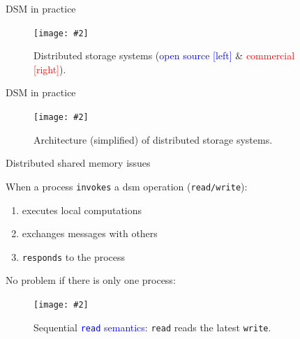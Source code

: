 \documentclass{beamer}
\newcommand{\fig}[3]
{
  \begin{figure}[htp]
    \centering
      \texttt{[image: \#2]}
      \caption[labelInTOC]{#3}
  \end{figure}
}
\newcommand{\blue}[1]{\textcolor{blue}{#1}}
\begin{document}
\begin{frame}{DSM in practice}
  \fig{width = 0.80\textwidth}{fig/dsss.pdf}{Distributed storage systems
    {\scriptsize (\textcolor{blue}{open source [left]} \&
    \textcolor{red}{commercial [right]})}.}
\end{frame}
\begin{frame}{DSM in practice}
  \fig{width = 0.618\textwidth}{fig/distributed_storage_system_arch.pdf}
  {Architecture (simplified) of distributed storage systems.}
\end{frame}

\begin{frame}{Distributed shared memory issues}
  \begin{exampleblock}{When a process \texttt{invokes} a dsm
  operation (\texttt{read/write}):}
    \begin{enumerate}
      \item executes local computations
      \item exchanges messages with others
      \item \texttt{responds} to the process
    \end{enumerate}
  \end{exampleblock}

  \begin{center}
  \end{center}

  \begin{block}{No problem if there is only one process:}
	  \fig{width = 0.85\textwidth}{fig/sequential-specification.pdf}
	  {Sequential \blue{\texttt{read} semantics}: \texttt{read} reads the
	  latest \texttt{write}.}
  \end{block}
\end{frame}
\end{document}

